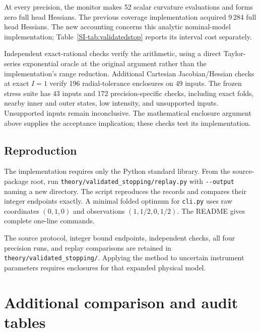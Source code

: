At every precision, the monitor makes 52 scalar curvature evaluations and forms zero full head Hessians. The previous coverage implementation acquired 9\,284 full head Hessians. The new accounting concerns this analytic nominal-model implementation; Table~\ref{SI-tab:validatedstop} reports its interval cost separately.

Independent exact-rational checks verify the arithmetic, using a direct Taylor-series exponential oracle at the original argument rather than the implementation's range reduction. Additional Cartesian Jacobian/Hessian checks at exact $I=1$ verify 196 radial-tolerance enclosures on 49 inputs. The frozen stress suite has 43 inputs and 172 precision-specific checks, including exact folds, nearby inner and outer states, low intensity, and unsupported inputs. Unsupported inputs remain inconclusive. The mathematical enclosure argument above supplies the acceptance implication; these checks test its implementation.

\subsection{Reproduction}
The implementation requires only the Python standard library. From the source-package root, run \nolinkurl{theory/validated_stopping/replay.py} with \nolinkurl{--output} naming a new directory. The script reproduces the records and compares their integer endpoints exactly. A minimal folded optimum for \nolinkurl{cli.py} uses raw coordinates $(0,1,0)$ and observations $(1,1/2,0,1/2)$. The README gives complete one-line commands.

The source protocol, integer bound endpoints, independent checks, all four precision runs, and replay comparisons are retained in \nolinkurl{theory/validated_stopping/}. Applying the method to uncertain instrument parameters requires enclosures for that expanded physical model.



\clearpage
\section{Additional comparison and audit tables}
\label{SI-sec:extra_tables}

